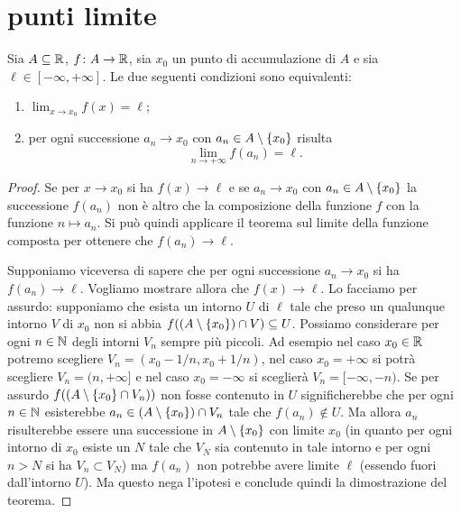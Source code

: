 \section{punti limite}

\begin{theorem}%
  \label{th:ponte}%
  \mymark{***}%
  Sia $A \subseteq \mathbb R$, $f\colon A \to \mathbb R$, sia $x_0$ un punto di accumulazione di $A$ e sia
  $\ell \in [-\infty, +\infty]$.
  Le due seguenti condizioni sono equivalenti:
  \begin{enumerate}
  \item $\displaystyle \lim_{x\to x_0} f(x) = \ell$;
  \item per ogni successione $a_n\to x_0$ con $a_n\in A\setminus{\left\{ x_0 \right\}}$ risulta
  \[
  \lim_{n\to+\infty} f(a_n) = \ell. 
  \]
  \end{enumerate}
  \end{theorem}
  \begin{proof}
  \mymark{***}
  Se per $x\to x_0$ si ha $f(x)\to \ell$ e se $a_n \to x_0$ con $a_n\in A\setminus{\left\{ x_0 \right\}}$ la successione $f(a_n)$ non è altro che la composizione
  della funzione $f$ con la funzione $n\mapsto a_n$. Si può quindi applicare
  il teorema sul limite della funzione composta per ottenere che $f(a_n)\to \ell$.
  
  Supponiamo viceversa di sapere che per ogni successione $a_n\to x_0$ si ha $f(a_n)\to \ell$. Vogliamo mostrare allora che $f(x)\to \ell$. Lo facciamo per assurdo: supponiamo che esista un intorno $U$ di $\ell$ tale che preso un qualunque intorno $V$ di $x_0$ non si abbia $f((A\setminus{\left\{ x_0 \right\}})\cap V)\subseteq U$.
  Possiamo considerare per ogni $n\in \mathbb N$ degli intorni $V_n$ sempre più piccoli. Ad esempio nel caso $x_0 \in \mathbb R$ potremo scegliere $V_n = (x_0-1/n, x_0+1/n)$, nel caso $x_0 = +\infty$ si potrà scegliere $V_n = (n,+\infty]$ e nel caso $x_0=-\infty$ si sceglierà $V_n = [-\infty, -n)$.
  Se per assurdo $f((A\setminus{\left\{ x_0 \right\}}\cap V_n))$ non fosse contenuto in $U$
  significherebbe che per ogni $n\in\mathbb N$ esisterebbe $a_n \in (A\setminus{\left\{ x_0 \right\}})\cap V_n$ tale che $f(a_n)\not \in U$. Ma allora $a_n$ risulterebbe essere una successione in
  $A\setminus {\left\{ x_0 \right\}}$ con limite $x_0$
  (in quanto per ogni intorno di $x_0$ esiste un $N$ tale che $V_N$ sia contenuto in tale intorno e per ogni $n>N$ si ha $V_n\subset V_N$)
  ma $f(a_n)$ non potrebbe avere limite $\ell$
  (essendo fuori dall'intorno $U$).
  Ma questo nega l'ipotesi e conclude quindi la dimostrazione del teorema.
  \end{proof}


